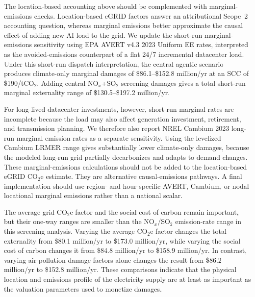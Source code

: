 \documentclass{article}
\begin{document}

The location-based accounting above should be complemented with marginal-emissions checks. Location-based eGRID factors answer an attributional Scope~2 accounting question, whereas marginal emissions better approximate the causal effect of adding new AI load to the grid. We update the short-run marginal-emissions sensitivity using EPA AVERT v4.3 2023 Uniform EE rates, interpreted as the avoided-emissions counterpart of a flat 24/7
incremental datacenter load. Under this short-run dispatch interpretation, the central agentic scenario produces climate-only marginal damages of \$86.1--\$152.8 million/yr at an SCC of \$190/tCO$_2$. Adding central NO$_x$+SO$_2$ screening damages gives a total short-run marginal externality range of \$130.5--\$197.2 million/yr.

For long-lived datacenter investments, however, short-run marginal rates are incomplete because the load may also affect generation investment, retirement, and transmission planning. We therefore also report NREL Cambium 2023 long-run marginal emission rates as a separate sensitivity. Using the levelized Cambium LRMER range gives substantially lower climate-only damages, because the modeled long-run grid partially decarbonizes and adapts to demand changes. These marginal-emissions calculations should not be added to the location-based eGRID CO$_2$e estimate. They are alternative causal-emissions pathways. A final implementation should use region- and hour-specific AVERT, Cambium, or nodal locational marginal emissions rather than a national scalar.

The average grid CO$_2$e factor and the social cost of carbon remain important, but their one-way ranges are smaller than the NO$_x$/SO$_2$ emission-rate range in this screening analysis. Varying the average CO$_2$e factor changes the total externality from \$80.1 million/yr to \$173.0 million/yr, while varying the social cost of carbon changes it from \$84.8 million/yr to \$158.9 million/yr. In contrast, varying air-pollution damage factors alone changes the result from \$86.2 million/yr to \$152.8 million/yr. These comparisons indicate that the physical location and emissions profile of the electricity supply are at least as important as the valuation parameters used to monetize damages.
\end{document}
